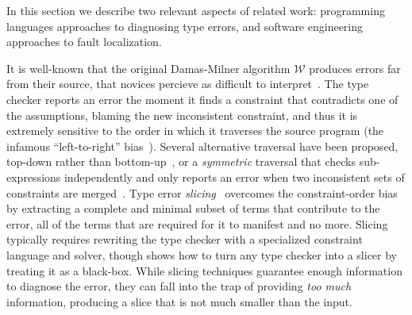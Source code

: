\label{sec:nate:related-work}
\label{sec:nate:type-error-diagnosis}

In this section we describe two relevant aspects of related work:
%
programming languages approaches to diagnosing type errors, and
%
software engineering approaches to fault localization.
%
%
%

It is well-known that the original Damas-Milner
algorithm $\mathcal{W}$ produces errors far
from their source, that novices percieve as
difficult to interpret~\citep{Wand1986-nw}.
%
%
The type checker reports an error the moment
it finds a constraint that contradicts one
of the assumptions, blaming the new inconsistent
constraint, and thus it is extremely sensitive
to the order in which it traverses the source
program (the infamous ``left-to-right''
bias~\citep{McAdam1998-ub}).
%
Several alternative traversal have been proposed,
\eg top-down rather than bottom-up~\citep{Lee1998-ys},
or a \emph{symmetric} traversal that checks
sub-expressions independently and only reports an
error when two inconsistent sets of constraints are
merged~\citep{McAdam1998-ub,Yang1999-yr}.
%
Type error \emph{slicing}~\citep{Haack2003-vc,Tip2001-qp,Rahli2010-ps}
overcomes the constraint-order bias by extracting a
complete and minimal subset
of terms that contribute to the error, \ie all of the
terms that are required for it to manifest and no more.
%
Slicing typically requires rewriting the type checker with a
specialized constraint language and solver, though
\citet{Schilling2011-yf} shows how to turn any type checker into a
slicer by treating it as a black-box.
%
While slicing techniques guarantee enough information to diagnose the
error, they can fall into the trap of providing \emph{too much}
information, producing a slice that is not much smaller than
the input. %


